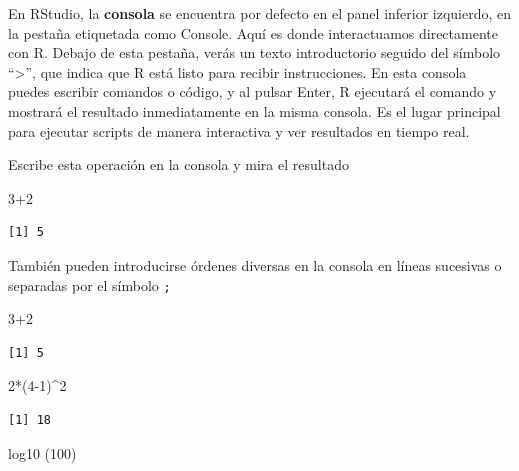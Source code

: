 \documentclass[
  letterpaper,
]{scrbook}
\newenvironment{Shaded}{\begin{snugshade}}{\end{snugshade}}
\newcommand{\DecValTok}[1]{\textcolor[rgb]{0.68,0.00,0.00}{#1}}
\newcommand{\FunctionTok}[1]{\textcolor[rgb]{0.28,0.35,0.67}{#1}}
\newcommand{\NormalTok}[1]{\textcolor[rgb]{0.00,0.23,0.31}{#1}}
\newcommand{\SpecialCharTok}[1]{\textcolor[rgb]{0.37,0.37,0.37}{#1}}
\begin{document}
En RStudio, la \textbf{consola} se encuentra por defecto en el panel
inferior izquierdo, en la pestaña etiquetada como Console. Aquí es donde
interactuamos directamente con R. Debajo de esta pestaña, verás un texto
introductorio seguido del símbolo ``\textgreater{}'', que indica que R
está listo para recibir instrucciones. En esta consola puedes escribir
comandos o código, y al pulsar Enter, R ejecutará el comando y mostrará
el resultado inmediatamente en la misma consola. Es el lugar principal
para ejecutar scripts de manera interactiva y ver resultados en tiempo
real.

Escribe esta operación en la consola y mira el resultado

\begin{Shaded}
\begin{Highlighting}[]
\DecValTok{3}\SpecialCharTok{+}\DecValTok{2}
\end{Highlighting}
\end{Shaded}

\begin{verbatim}
[1] 5
\end{verbatim}

También pueden introducirse órdenes diversas en la consola en líneas
sucesivas o separadas por el símbolo \texttt{;}

\begin{Shaded}
\begin{Highlighting}[]
\DecValTok{3}\SpecialCharTok{+}\DecValTok{2} 
\end{Highlighting}
\end{Shaded}

\begin{verbatim}
[1] 5
\end{verbatim}

\begin{Shaded}
\begin{Highlighting}[]
\DecValTok{2}\SpecialCharTok{*}\NormalTok{(}\DecValTok{4{-}1}\NormalTok{)}\SpecialCharTok{\^{}}\DecValTok{2} 
\end{Highlighting}
\end{Shaded}

\begin{verbatim}
[1] 18
\end{verbatim}

\begin{Shaded}
\begin{Highlighting}[]
\FunctionTok{log10}\NormalTok{ (}\DecValTok{100}\NormalTok{) }
\end{Highlighting}
\end{Shaded}
\end{document}
